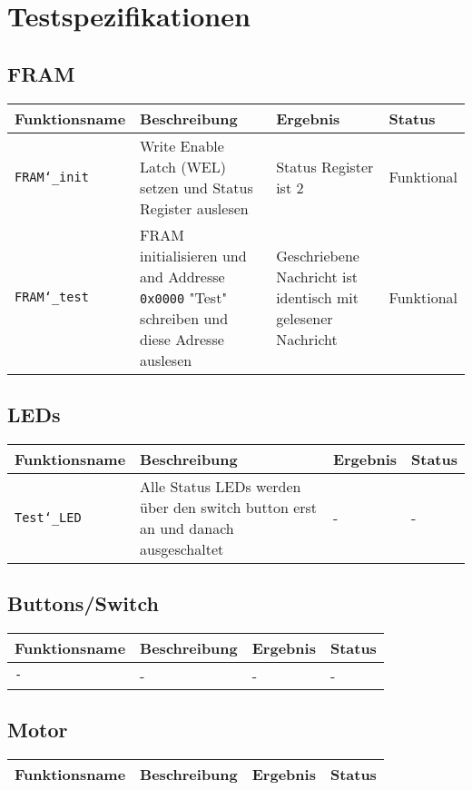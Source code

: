 \documentclass{article}
\begin{document}
	\section{Testspezifikationen}
	\subsection{FRAM}
		\begin{tabular}{|p{3.2cm}|p{5.5cm}|p{4cm}| p{1.6cm} |}
			\hline
				\textbf{Funktionsname} & \textbf{Beschreibung} & \textbf{Ergebnis} & \textbf{Status} \\
			\hline
				\texttt{FRAM\char`_init} & Write Enable Latch (WEL) setzen und Status Register auslesen & Status Register ist 2 & Funktional \\
			\hline
				\texttt{FRAM\char`_test} & FRAM initialisieren und and Addresse \texttt{0x0000} "Test" schreiben und diese Adresse auslesen & Geschriebene Nachricht ist identisch mit gelesener Nachricht & Funktional\\
			\hline
		\end{tabular}
	\subsection{LEDs}
		\begin{tabular}{|p{3.2cm}|p{5.5cm}|p{4cm}| p{1.6cm} |}
			\hline
				\textbf{Funktionsname} & \textbf{Beschreibung} & \textbf{Ergebnis} & \textbf{Status} \\
			\hline
				 \texttt{Test\char`_LED} & Alle Status LEDs werden über den switch button erst an und danach ausgeschaltet & - & - \\
			\hline
		\end{tabular}
		\subsection{Buttons/Switch}
	\begin{tabular}{|p{3.2cm}|p{5.5cm}|p{4cm}| p{1.6cm} |}
		\hline
			\textbf{Funktionsname} & \textbf{Beschreibung} & \textbf{Ergebnis} & \textbf{Status} \\
		\hline
			 \texttt{-} & - & - & - \\
		\hline
	\end{tabular}
	\subsection{Motor}
		\begin{tabular}{|p{3.2cm}|p{5.5cm}|p{4cm}| p{1.6cm} |}
			\hline
				\textbf{Funktionsname} & \textbf{Beschreibung} & \textbf{Ergebnis} & \textbf{Status} \\
			\hline
		\end{tabular}
\end{document}
